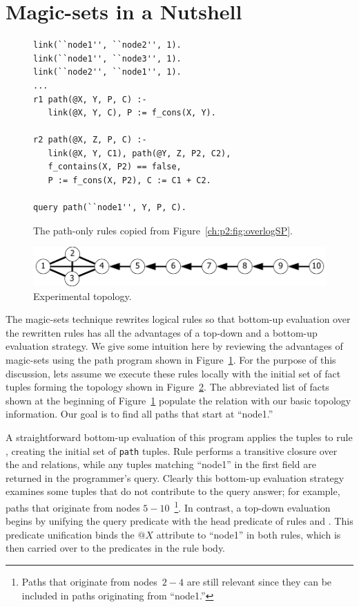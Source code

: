 \section{Magic-sets in a Nutshell}
\label{ch:magic:sec:review}

\begin{figure}[!t]
\ssp
\centering
\begin{lstlisting}
link(``node1'', ``node2'', 1).
link(``node1'', ``node3'', 1).
link(``node2'', ``node1'', 1).
...
r1 path(@X, Y, P, C) :-
   link(@X, Y, C), P := f_cons(X, Y).

r2 path(@X, Z, P, C) :-
   link(@X, Y, C1), path(@Y, Z, P2, C2),
   f_contains(X, P2) == false,
   P := f_cons(X, P2), C := C1 + C2.

query path(``node1'', Y, P, C).
\end{lstlisting}
\caption{\label{ch:magic:fig:basicSP}The path-only rules copied from Figure~\ref{ch:p2:fig:overlogSP}.}
\end{figure}

\begin{figure}
\centering
\includegraphics[scale=1.2]{figures/Topology}
\caption{Experimental topology.}
\label{ch:magic:fig:topo}
\end{figure}

The magic-sets technique rewrites logical rules so that bottom-up evaluation
over the rewritten rules has all the advantages of a top-down and a bottom-up
evaluation strategy.  We give some intuition here by reviewing the advantages
of magic-sets using the path program shown in
Figure~\ref{ch:magic:fig:basicSP}.  For the purpose of this discussion, lets
assume we execute these rules locally with the initial set of  fact
tuples forming the topology shown in Figure~\ref{ch:magic:fig:topo}.  The
abbreviated list of facts shown at the beginning of
Figure~\ref{ch:magic:fig:basicSP} populate the  relation with our
basic topology information.  Our goal is to find all paths that start at
``node1.''

A straightforward bottom-up evaluation of this program applies the 
tuples to rule , creating the initial set of {\tt path} tuples.  Rule
 performs a transitive closure over the  and 
relations, while any  tuples matching ``node1'' in the first field are
returned in the programmer's query.  Clearly this bottom-up evaluation strategy
examines some  tuples that do not contribute to the query answer; for
example, paths that originate from nodes $5-10$~\footnote{Paths that originate
from nodes~$2-4$ are still relevant since they can be included in paths
originating from ``node1.''}.  In contrast, a top-down evaluation begins by
unifying the query predicate with the head predicate of rules  and
.  This  predicate unification binds the $@X$ attribute to
``node1'' in both rules, which is then carried over to the predicates in the
rule body.

